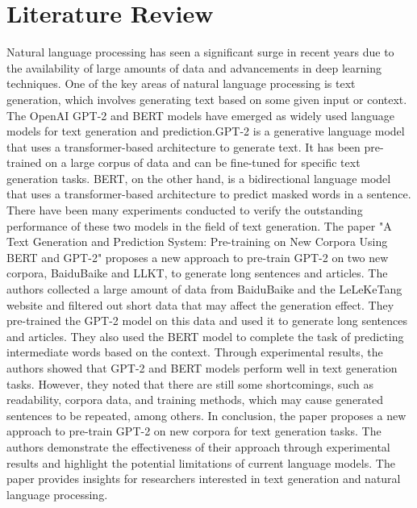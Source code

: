 \documentclass[12pt]{IEEEtran}
\begin{document}
\section{Literature Review}
Natural language processing has seen a significant surge in recent years due to the availability of large amounts of data and advancements in deep learning techniques. One of the key areas of natural language processing is text generation, which involves generating text based on some given input or context. The OpenAI GPT-2 and BERT models have emerged as widely used language models for text generation and prediction.GPT-2 is a generative language model that uses a transformer-based architecture to generate text. It has been pre-trained on a large corpus of data and can be fine-tuned for specific text generation tasks. BERT, on the other hand, is a bidirectional language model that uses a transformer-based architecture to predict masked words in a sentence. There have been many experiments conducted to verify the outstanding performance of these two models in the field of text generation. The paper "A Text Generation and Prediction System: \cite{Gpt-2_text} Pre-training on New Corpora Using BERT and GPT-2" proposes a new approach to pre-train GPT-2 on two new corpora, BaiduBaike and LLKT, to generate long sentences and articles. The authors collected a large amount of data from BaiduBaike and the LeLeKeTang website and filtered out short data that may affect the generation effect. They pre-trained the GPT-2 model on this data and used it to generate long sentences and articles. They also used the BERT model to complete the task of predicting intermediate words based on the context. Through experimental results, the authors showed that GPT-2 and BERT models perform well in text generation tasks. However, they noted that there are still some shortcomings, such as readability, corpora data, and training methods, which may cause generated sentences to be repeated, among others. In conclusion, the paper proposes a new approach to pre-train GPT-2 on new corpora for text generation tasks. The authors demonstrate the effectiveness of their approach through experimental results and highlight the potential limitations of current language models. The paper provides insights for researchers interested in text generation and natural language processing.
\end{document}
